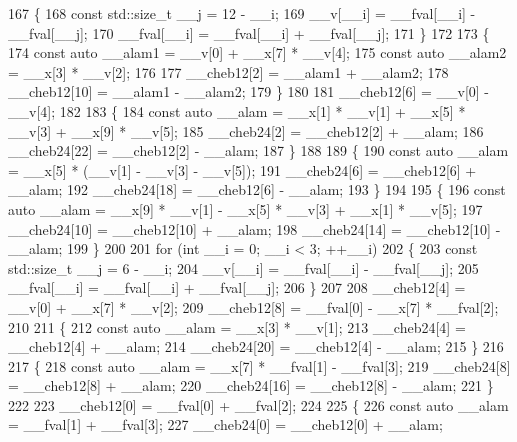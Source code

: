 \begin{DoxyCode}
167         \{
168           \textcolor{keyword}{const} std::size\_t \_\_j = 12 - \_\_i;
169           \_\_v[\_\_i] = \_\_fval[\_\_i] - \_\_fval[\_\_j];
170           \_\_fval[\_\_i] = \_\_fval[\_\_i] + \_\_fval[\_\_j];
171         \}
172 
173       \{
174         \textcolor{keyword}{const} \textcolor{keyword}{auto} \_\_alam1 = \_\_v[0] + \_\_x[7] * \_\_v[4];
175         \textcolor{keyword}{const} \textcolor{keyword}{auto} \_\_alam2 = \_\_x[3] * \_\_v[2];
176 
177         \_\_cheb12[2] = \_\_alam1 + \_\_alam2;
178         \_\_cheb12[10] = \_\_alam1 - \_\_alam2;
179       \}
180 
181       \_\_cheb12[6] = \_\_v[0] - \_\_v[4];
182 
183       \{
184         \textcolor{keyword}{const} \textcolor{keyword}{auto} \_\_alam = \_\_x[1] * \_\_v[1] + \_\_x[5] * \_\_v[3] + \_\_x[9] * \_\_v[5];
185         \_\_cheb24[2] = \_\_cheb12[2] + \_\_alam;
186         \_\_cheb24[22] = \_\_cheb12[2] - \_\_alam;
187       \}
188 
189       \{
190         \textcolor{keyword}{const} \textcolor{keyword}{auto} \_\_alam = \_\_x[5] * (\_\_v[1] - \_\_v[3] - \_\_v[5]);
191         \_\_cheb24[6] = \_\_cheb12[6] + \_\_alam;
192         \_\_cheb24[18] = \_\_cheb12[6] - \_\_alam;
193       \}
194 
195       \{
196         \textcolor{keyword}{const} \textcolor{keyword}{auto} \_\_alam = \_\_x[9] * \_\_v[1] - \_\_x[5] * \_\_v[3] + \_\_x[1] * \_\_v[5];
197         \_\_cheb24[10] = \_\_cheb12[10] + \_\_alam;
198         \_\_cheb24[14] = \_\_cheb12[10] - \_\_alam;
199       \}
200 
201       \textcolor{keywordflow}{for} (\textcolor{keywordtype}{int} \_\_i = 0; \_\_i < 3; ++\_\_i)
202         \{
203           \textcolor{keyword}{const} std::size\_t \_\_j = 6 - \_\_i;
204           \_\_v[\_\_i] = \_\_fval[\_\_i] - \_\_fval[\_\_j];
205           \_\_fval[\_\_i] = \_\_fval[\_\_i] + \_\_fval[\_\_j];
206         \}
207 
208       \_\_cheb12[4] = \_\_v[0] + \_\_x[7] * \_\_v[2];
209       \_\_cheb12[8] = \_\_fval[0] - \_\_x[7] * \_\_fval[2];
210 
211       \{
212         \textcolor{keyword}{const} \textcolor{keyword}{auto} \_\_alam = \_\_x[3] * \_\_v[1];
213         \_\_cheb24[4] = \_\_cheb12[4] + \_\_alam;
214         \_\_cheb24[20] = \_\_cheb12[4] - \_\_alam;
215       \}
216 
217       \{
218         \textcolor{keyword}{const} \textcolor{keyword}{auto} \_\_alam = \_\_x[7] * \_\_fval[1] - \_\_fval[3];
219         \_\_cheb24[8] = \_\_cheb12[8] + \_\_alam;
220         \_\_cheb24[16] = \_\_cheb12[8] - \_\_alam;
221       \}
222 
223       \_\_cheb12[0] = \_\_fval[0] + \_\_fval[2];
224 
225       \{
226         \textcolor{keyword}{const} \textcolor{keyword}{auto} \_\_alam = \_\_fval[1] + \_\_fval[3];
227         \_\_cheb24[0] = \_\_cheb12[0] + \_\_alam;

\end{DoxyCode}
